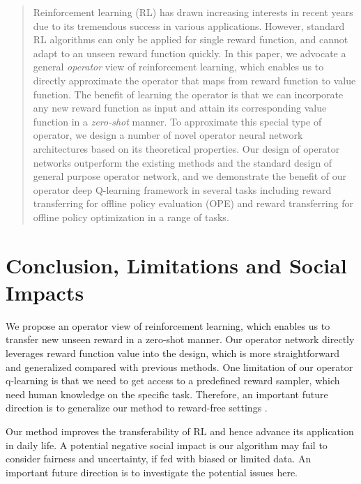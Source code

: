 \begin{abstract}
Reinforcement learning (RL) has drawn increasing interests in recent years due to its tremendous success in various applications.
However, standard RL algorithms can only be applied for single reward function, and cannot adapt to an unseen reward function quickly.
In this paper, we advocate a general \emph{operator} view of reinforcement learning, which enables us to directly approximate the operator that maps from reward function to value function.
The benefit of learning the operator is that we can incorporate any new reward function as input and attain its corresponding value function in a \emph{zero-shot} manner.
To approximate this special type of operator, 
we design a number of novel operator neural network architectures based on its theoretical properties.
Our design of operator networks outperform the existing methods and the standard design of general purpose operator network,
and we demonstrate the benefit of our operator deep Q-learning framework in several tasks including reward transferring for offline policy evaluation (OPE) and reward transferring for offline policy optimization in a range of tasks.

\end{abstract}









\section{Conclusion, Limitations and Social Impacts}
\label{sec:conclustion}

We propose an operator view of reinforcement learning, which enables us to transfer new unseen reward in a zero-shot manner. 
Our operator network directly leverages reward function value into the design,
which is more straightforward and generalized compared with previous methods.
One limitation of our operator q-learning is that we need to get access to a predefined reward sampler, which need human knowledge on the specific task.
Therefore, an important future direction is to generalize our method to  reward-free settings \citep[e.g.][]{jin2020reward}.


Our method improves the transferability of RL and hence advance its application in daily life. A potential negative social impact is our algorithm may fail to consider fairness and uncertainty, if fed  with biased or limited data. An important future direction is to investigate the potential issues here. 
\clearpage




